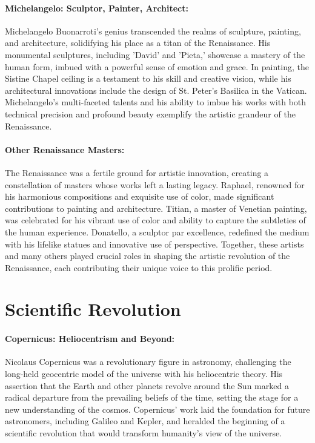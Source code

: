 \documentclass{book}
\begin{document}
\paragraph{Michelangelo: Sculptor, Painter, Architect:}
Michelangelo Buonarroti’s genius transcended the realms of sculpture, painting, and architecture, solidifying his place as a titan of the Renaissance. His monumental sculptures, including 'David' and 'Pieta,' showcase a mastery of the human form, imbued with a powerful sense of emotion and grace. In painting, the Sistine Chapel ceiling is a testament to his skill and creative vision, while his architectural innovations include the design of St. Peter’s Basilica in the Vatican. Michelangelo's multi-faceted talents and his ability to imbue his works with both technical precision and profound beauty exemplify the artistic grandeur of the Renaissance.

\paragraph{Other Renaissance Masters:}
The Renaissance was a fertile ground for artistic innovation, creating a constellation of masters whose works left a lasting legacy. Raphael, renowned for his harmonious compositions and exquisite use of color, made significant contributions to painting and architecture. Titian, a master of Venetian painting, was celebrated for his vibrant use of color and ability to capture the subtleties of the human experience. Donatello, a sculptor par excellence, redefined the medium with his lifelike statues and innovative use of perspective. Together, these artists and many others played crucial roles in shaping the artistic revolution of the Renaissance, each contributing their unique voice to this prolific period.

\section*{Scientific Revolution}

\paragraph{Copernicus: Heliocentrism and Beyond:}
Nicolaus Copernicus was a revolutionary figure in astronomy, challenging the long-held geocentric model of the universe with his heliocentric theory. His assertion that the Earth and other planets revolve around the Sun marked a radical departure from the prevailing beliefs of the time, setting the stage for a new understanding of the cosmos. Copernicus’ work laid the foundation for future astronomers, including Galileo and Kepler, and heralded the beginning of a scientific revolution that would transform humanity’s view of the universe.
\end{document}
